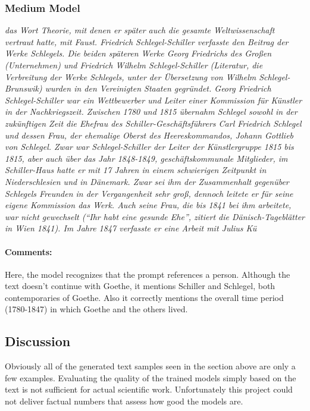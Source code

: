 \documentclass{scrartcl}
\begin{document}
\subsubsection{Medium Model}
{\itshape
 das Wort Theorie, mit denen er später auch die gesamte Weltwissenschaft vertraut hatte, mit Faust.
Friedrich Schlegel-Schiller verfasste den Beitrag der Werke Schlegels.
Die beiden späteren Werke Georg Friedrichs des Großen (Unternehmen) und Friedrich Wilhelm Schlegel-Schiller (Literatur, die Verbreitung der Werke Schlegels, unter der Übersetzung von Wilhelm Schlegel-Brunswik) wurden in den Vereinigten Staaten gegründet.
Georg Friedrich Schlegel-Schiller war ein Wettbewerber und Leiter einer Kommission für Künstler in der Nachkriegszeit.
Zwischen 1780 und 1815 übernahm Schlegel sowohl in der zukünftigen Zeit die Ehefrau des Schiller-Geschäftsführers Carl Friedrich Schlegel und dessen Frau, der ehemalige Oberst des Heereskommandos, Johann Gottlieb von Schlegel.
Zwar war Schlegel-Schiller der Leiter der Künstlergruppe 1815 bis 1815, aber auch über das Jahr 1848-1849, geschäftskommunale Mitglieder, im Schiller-Haus hatte er mit 17 Jahren in einem schwierigen Zeitpunkt in Niederschlesien und in Dänemark.
Zwar sei ihm der Zusammenhalt gegenüber Schlegels Freunden in der Vergangenheit sehr groß, dennoch leitete er für seine eigene Kommission das Werk.
Auch seine Frau, die bis 1841 bei ihm arbeitete, war nicht gewechselt (\enquote{Ihr habt eine gesunde Ehe}, zitiert die Dänisch-Tageblätter in Wien 1841).
Im Jahre 1847 verfasste er eine Arbeit mit Julius Kü
}

\paragraph{Comments:} Here, the model recognizes that the prompt references a person. Although the text doesn't continue with Goethe, it mentions Schiller and Schlegel, both contemporaries of Goethe. Also it correctly mentions the overall time period (1780-1847) in which Goethe and the others lived.

\subsection{Discussion}
Obviously all of the generated text samples seen in the section above are only a few examples. Evaluating the quality of the trained models simply based on the text is not sufficient for actual scientific work. Unfortunately this project could not deliver factual numbers that assess how good the models are.
\end{document}
